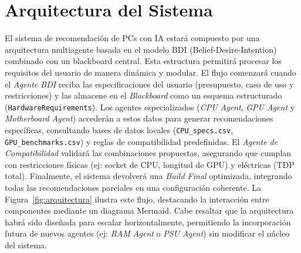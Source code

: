 \documentclass{llncs}
\begin{document}
	
	\section{Arquitectura del Sistema}
	\label{sec:arquitectura}
	
	El sistema de recomendación de PCs con IA estará compuesto por una arquitectura multiagente basada en el modelo BDI (Belief-Desire-Intention) combinado con un blackboard central. Esta estructura permitirá procesar los requisitos del usuario de manera dinámica y modular. El flujo comenzará cuando el \textit{Agente BDI} reciba las especificaciones del usuario (presupuesto, caso de uso y restricciones) y las almacene en el \textit{Blackboard} como un esquema estructurado (\texttt{HardwareRequirements}). Los agentes especializados (\textit{CPU Agent}, \textit{GPU Agent} y \textit{Motherboard Agent}) accederán a estos datos para generar recomendaciones específicas, consultando bases de datos locales (\texttt{CPU\_specs.csv}, \texttt{GPU\_benchmarks.csv}) y reglas de compatibilidad predefinidas. El \textit{Agente de Compatibilidad} validará las combinaciones propuestas, asegurando que cumplan con restricciones físicas (ej: socket de CPU, longitud de GPU) y eléctricas (TDP total). Finalmente, el sistema devolverá una \textit{Build Final} optimizada, integrando todas las recomendaciones parciales en una configuración coherente. La Figura~\ref{fig:arquitectura} ilustra este flujo, destacando la interacción entre componentes mediante un diagrama Mermaid. Cabe resaltar que la arquitectura habrá sido diseñada para escalar horizontalmente, permitiendo la incorporación futura de nuevos agentes (ej: \textit{RAM Agent} o \textit{PSU Agent}) sin modificar el núcleo del sistema.
	
\end{document}
